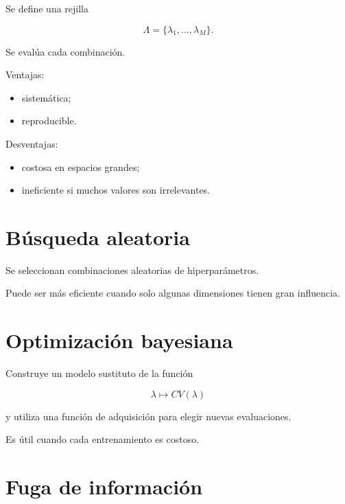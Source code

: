 \documentclass[
  spanish,
  10.5pt,
  letterpaper,
  DIV=11,
  numbers=noendperiod,
  oneside,
  open=any]{scrreprt}
\providecommand{\tightlist}{%
  \setlength{\itemsep}{0pt}\setlength{\parskip}{0pt}}
\theoremstyle{definition}
\theoremstyle{definition}
\theoremstyle{plain}
\theoremstyle{remark}
\begin{document}

Se define una rejilla

\[
\Lambda
=
\{
\lambda_1,\ldots,\lambda_M
\}.
\]

Se evalúa cada combinación.

Ventajas:

\begin{itemize}
\tightlist
\item
  sistemática;
\item
  reproducible.
\end{itemize}

Desventajas:

\begin{itemize}
\tightlist
\item
  costosa en espacios grandes;
\item
  ineficiente si muchos valores son irrelevantes.
\end{itemize}

\section*{Búsqueda aleatoria}\label{buxfasqueda-aleatoria}


Se seleccionan combinaciones aleatorias de hiperparámetros.

Puede ser más eficiente cuando solo algunas dimensiones tienen gran
influencia.

\section*{Optimización bayesiana}\label{optimizaciuxf3n-bayesiana}


Construye un modelo sustituto de la función

\[
\lambda
\mapsto
CV(\lambda)
\]

y utiliza una función de adquisición para elegir nuevas evaluaciones.

Es útil cuando cada entrenamiento es costoso.

\section*{Fuga de información}\label{fuga-de-informaciuxf3n}
\end{document}
